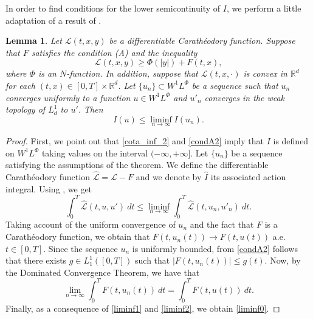 \documentclass[twoside]{article}
\newtheorem{lem}[thm]{Lemma}
\theoremstyle{remark}
\newcommand{\lphi}{L^{\Phi}}
\newcommand{\wphi}{W^{1}\lphi}
\newcommand{\rr}{\mathbb{R}}
\renewcommand{\leq}{\leqslant}
\renewcommand{\geq}{\geqslant}
\begin{document}
In order to find conditions for the lower semicontinuity of  $I$, 
we perform a little adaptation of  a result of \cite{ekeland1999convex}. 


\begin{lem}\label{semicontinf}
Let $\mathcal{L}(t,x,y)$ be a  differentiable Carath\'eodory function. Suppose that  $F$ satisfies the condition (A) and the inequality
\begin{equation}\label{cota_inf_2}
\mathcal{L}(t,x,y)\geq \Phi\left(|y|\right)+ F(t,x),
\end{equation}
where $\Phi$ is an $N$-function. 
In addition, suppose that  $\mathcal{L}(t,x,\cdot)$ is convex in $\rr^d$ for each $(t,x)\in [0,T]\times\rr^d$.  Let $\{u_n\}\subset\wphi$ be a sequence such that $u_n$ converges  uniformly  to a function $u\in\wphi$ and $u'_n$ converges in the weak topology of $L^1_d$ to $u'$.   Then
\begin{equation}\label{liminf0}I(u)\leq \liminf_{n\to\infty}I(u_n).
\end{equation}

\end{lem}

\begin{proof} First, we point out that \eqref{cota_inf_2} and \eqref{condA2} imply that $I$ is defined on $\wphi$ taking values on the interval $(-\infty,+\infty]$. 
Let $\{u_n\}$ be a sequence  satisfying the assumptions of the theorem.   We define the differentiable Carath\'eodory function $\mathcal{\hat{L}}=\mathcal{L}-F$ and we denote by $\hat{I}$ its  associated action integral. Using  \cite[Thm. 2.1, p. 243]{ekeland1999convex}, we get
\begin{equation}\label{liminf1}
\int_0^T\mathcal{\hat{L}}(t,u,u')\ dt\leq \liminf_{n\to\infty}\int_0^T\mathcal{\hat{L}}(t,u_n,u'_n)\ dt.
\end{equation}
Taking account of the uniform convergence of $u_n$ and the fact that  $F$  is a  Carath\'eodory function,  we obtain that $F(t,u_n(t))\to F(t,u(t))$ a.e. $t\in[0,T]$.  Since the sequence $u_n$ is uniformly bounded, from \eqref{condA2} follows that there exists $g\in L_1^1([0,T])$ such that $|F(t,u_n(t))|\leq g(t)$. Now, by the Dominated Convergence Theorem, we have that
\begin{equation}\label{liminf2}
\lim_{n\to\infty}\int_0^TF(t,u_n(t))\ dt=\int_0^TF(t,u(t))\ dt.
\end{equation}
Finally, as a consequence of  \eqref{liminf1} and  \eqref{liminf2}, we obtain \eqref{liminf0}.
\end{proof}
\end{document}
